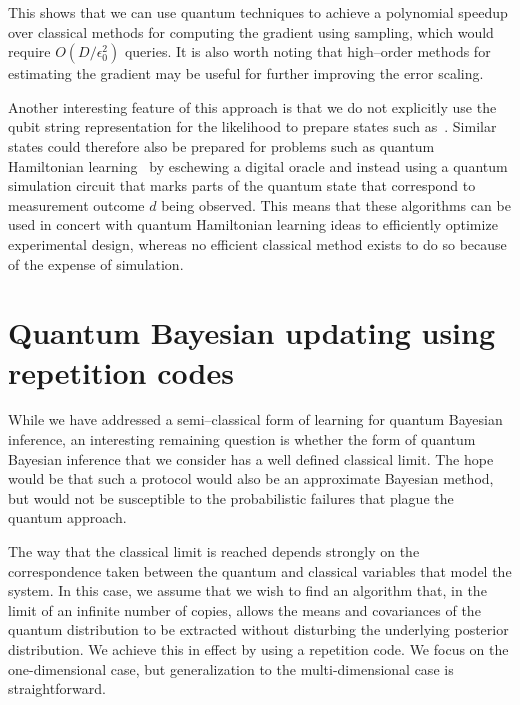 \documentclass[aps,amsmath,onecolumn,amssymb,notitlepage]{revtex4-1}
\begin{document}
This shows that we can use quantum techniques to achieve a polynomial speedup over classical methods for computing the gradient using sampling, which would require $O(D/\epsilon_0^2)$ queries.  It is also worth noting that high--order methods for estimating the gradient may be useful for further improving the error scaling.

Another interesting feature of this approach is that we do not explicitly use the qubit string representation for the likelihood to prepare states such as~.   Similar states could therefore also be prepared for problems such as quantum Hamiltonian learning~\cite{WGF+14} by eschewing a digital oracle and instead using a quantum simulation circuit that marks parts of the quantum state that correspond to measurement outcome $d$ being observed.  This means that these algorithms can be used in concert with quantum Hamiltonian learning ideas to efficiently optimize experimental design, whereas no efficient classical method exists to do so because of the expense of simulation.

\section{Quantum Bayesian updating using repetition codes}
While we have addressed a semi--classical form of learning for quantum Bayesian inference, an interesting remaining question is whether the form of quantum
Bayesian inference that we consider has a well defined classical limit.  The hope would be that such a protocol would also be an approximate Bayesian method, but would not be susceptible to the probabilistic failures that plague the quantum approach.

The way that the classical limit is reached depends strongly on the correspondence taken between the quantum and classical variables that model the system.  In this case, we assume that we wish to find an algorithm that, in the limit of an infinite number of copies, allows the means and covariances of the quantum distribution to be extracted without disturbing the underlying posterior distribution.  We achieve this in effect by using a repetition code.  We focus on the one-dimensional case, but generalization to the multi-dimensional case is straightforward.
\end{document}
